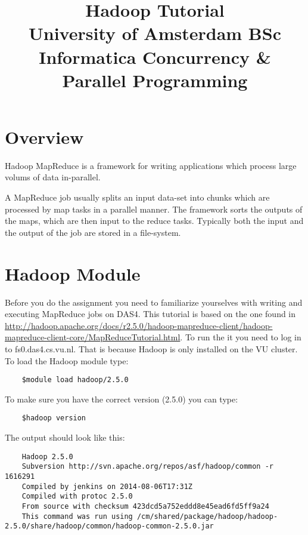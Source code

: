 \documentclass[a4paper,10pt]{article}
\date{}
\title{Hadoop Tutorial\\
  University of Amsterdam BSc Informatica
  Concurrency \& Parallel Programming
}
\begin{document}
  \maketitle
  
  \tableofcontents
  
  \section{Overview}
  
  
  Hadoop MapReduce is a framework for writing applications which process large volums of data in-parallel.
  
  A MapReduce job usually splits an input data-set into chunks which are processed by map tasks in a parallel manner. The framework sorts the outputs of the maps, which are then input to the reduce tasks. Typically both the input and the output of the job are stored in a file-system.
  
  
  \section{Hadoop Module}
  
  Before you do the assignment you need to familiarize yourselves with writing and executing MapReduce jobs on DAS4. This tutorial is based on the one found in \url{http://hadoop.apache.org/docs/r2.5.0/hadoop-mapreduce-client/hadoop-mapreduce-client-core/MapReduceTutorial.html}. 
  To run the it you need to log in to fs0.das4.cs.vu.nl. That is because Hadoop is only installed on the VU cluster. To load the Hadoop module type: 
  
  \lstset{language=}
  
  \begin{lstlisting}
    $module load hadoop/2.5.0 
  \end{lstlisting}
  
  To make sure you have the correct version (2.5.0) you can type:
  \begin{lstlisting}
    $hadoop version
  \end{lstlisting}
  
  The output should look like this: 
  \begin{lstlisting}
    Hadoop 2.5.0
    Subversion http://svn.apache.org/repos/asf/hadoop/common -r 1616291
    Compiled by jenkins on 2014-08-06T17:31Z
    Compiled with protoc 2.5.0
    From source with checksum 423dcd5a752eddd8e45ead6fd5ff9a24
    This command was run using /cm/shared/package/hadoop/hadoop-2.5.0/share/hadoop/common/hadoop-common-2.5.0.jar
  \end{lstlisting}
  
\end{document}
